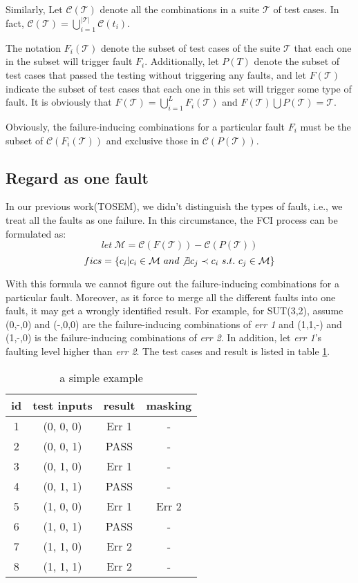 \documentclass{sig-alternate}
\begin{document}
Similarly, Let $\mathcal{C}(\mathcal{T})$ denote all the combinations in a suite $\mathcal{T}$ of test cases. In fact, $\mathcal{C}(\mathcal{T}) = \bigcup_{i = 1}^{|\mathcal{T}|}\mathcal{C}(t_{i})$.

The notation $F_{i}(\mathcal{T})$  denote the subset of test cases of the suite $\mathcal{T}$ that each one in the subset will trigger fault $F_{i}$.  Additionally, let $P(T)$ denote the subset of test cases that passed the testing without triggering any faults, and let $F(\mathcal{T})$ indicate the subset of test cases that each one in this set will trigger some type of fault. It is obviously that $F(\mathcal{T}) =  \bigcup_{i = 1}^{L}F_{i}(\mathcal{T})$ and $F(\mathcal{T})\bigcup P(\mathcal{T}) = \mathcal{T}$.

Obviously, the failure-inducing combinations for a particular fault $F_{i}$ must be the subset of $\mathcal{C}(F_{i}(\mathcal{T}))$ and exclusive those in $\mathcal{C}(P(\mathcal{T}))$.

\subsection{Regard as one fault}

In our previous work(TOSEM), we didn't distinguish the types of fault, i.e., we treat all the faults as one failure. In this circumstance, the FCI process can be formulated as:
 $$let\ \mathcal{M} = \mathcal{C}(F(\mathcal{T})) - \mathcal{C}(P(\mathcal{T}))$$
$$fics = \{c_{i} | c_{i} \in \mathcal{M} \ and \not\exists c_{j} \prec c_{i}\ s.t.\ c_{j} \in \mathcal{M} \}$$

With this formula we cannot figure out the failure-inducing combinations for a particular fault. Moreover, as it force to merge all the different faults into one fault, it may get a wrongly identified result. For example, for SUT(3,2), assume (0,-,0) and (-,0,0) are the failure-inducing combinations of \emph{err 1} and (1,1,-) and (1,-,0) is the failure-inducing combinations of \emph{err 2}. In addition, let \emph{err 1}'s faulting level higher than \emph{err 2}. The test cases and result is listed in table \ref{example_first_scenario}.

\begin{table}
\centering
\caption{a simple example}
\label{example_first_scenario}
\begin{tabular}{|c|c|c|c|} \hline
id&test inputs & result & masking \\\hline
1&(0, 0, 0) &  Err 1 & -\\ \hline
2&(0, 0, 1) &  PASS & -\\ \hline
3&(0, 1, 0) &  Err 1 & -\\ \hline
4&(0, 1, 1) &  PASS & -\\ \hline
5&(1, 0, 0) &  Err 1 & Err 2\\ \hline
6&(1, 0, 1) &  PASS & -\\ \hline
7&(1, 1, 0) &  Err 2 & -\\ \hline
8&(1, 1, 1) &  Err 2 & -\\ \hline
\hline\end{tabular}
\end{table}
\end{document}
